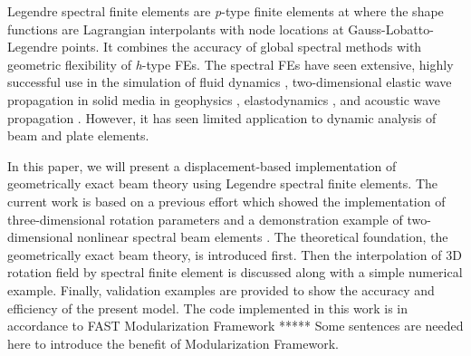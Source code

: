 \documentclass{aiaa-tc}
\begin{document}
Legendre spectral finite elements \cite{Ronquist:1987, Patera:1984} are {\it p}-type finite elements at where the shape functions are Lagrangian interpolants with node locations at Gauss-Lobatto-Legendre points. It combines the accuracy of global spectral methods with geometric flexibility of {\it h}-type FEs. The spectral FEs have seen extensive, highly successful use in the simulation of fluid dynamics \cite{Ronquist:1987, Patera:1984, Deville:2002}, two-dimensional elastic wave propagation in solid media in geophysics \cite{Komatitsch:1998}, elastodynamics \cite{Sridhar:2006}, and acoustic wave propagation \cite{Sprague:2003, Sprague:2004}. However, it has seen limited application to dynamic analysis of beam and plate elements. 

In this paper, we will present a displacement-based implementation of geometrically exact beam theory using Legendre spectral finite elements. {\color{red} The current work is based on a previous effort which showed the implementation of three-dimensional rotation parameters \cite{Wang:GEBT2013} and a demonstration example of two-dimensional nonlinear spectral beam elements \cite{Wang:SFE2013}.} The theoretical foundation, the geometrically exact beam theory, is introduced first. Then the interpolation of 3D rotation field by spectral finite element is discussed along with a simple numerical example. Finally, validation examples are provided to show the accuracy and efficiency of the present model. The code implemented in this work is in accordance to FAST Modularization Framework \cite{Jonkman:2013} ***** {\color{red} Some sentences are needed here to introduce the benefit of Modularization Framework}.  
\end{document}
